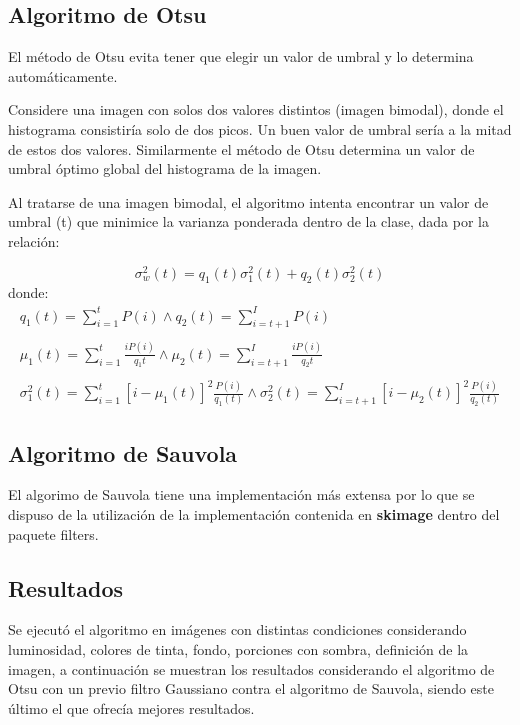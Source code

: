 \subsection{Algoritmo de Otsu}
El método de Otsu evita tener que elegir un valor de umbral y lo determina automáticamente.

Considere una imagen con solos dos valores distintos (imagen bimodal), donde el histograma consistiría solo de dos picos. Un buen valor de umbral sería a la mitad de estos dos valores. Similarmente el método de Otsu determina un valor de umbral óptimo global del histograma de la imagen.

Al tratarse de una imagen bimodal, el algoritmo intenta encontrar un valor de umbral (t) que minimice la varianza ponderada dentro de la clase, dada por la relación:

\begin{equation}
	\sigma _ {w} ^{2}(t) = q_{1}(t) \sigma _{1}^2(t) + q_{2}(t) \sigma _{2}^2(t)
\end{equation}
donde:
\begin{equation}
	\begin{array}{l}
		q_{1}(t) = \sum_{i=1}^{t} P(i) \wedge q_{2}(t) = \sum_{i=t+1}^{I} P(i)\\\\
		\mu_{1}(t) = \sum_{i=1}^{t} \frac{i P(i)}{q_1{t}} \wedge \mu_{2}(t) = \sum_{i=t+1}^{I} \frac{i P(i)}{q_2{t}}\\\\
		\sigma_{1}^2(t) = \sum_{i = 1}^{t} [i - \mu_{1}(t)]^2 \frac{P(i)}{q_{1}(t)} \wedge \sigma_{2}^2(t) = \sum_{i = t+1}^{I} [i - \mu_{2}(t)]^2 \frac{P(i)}{q_{2}(t)}
	\end{array}
\end{equation}



\subsection{Algoritmo de Sauvola}

El algorimo de Sauvola tiene una implementación más extensa por lo que se dispuso de la utilización de la implementación contenida en \textbf{skimage} dentro del paquete filters.




\subsection{Resultados}
Se ejecutó el algoritmo en imágenes con distintas condiciones considerando luminosidad, colores de tinta, fondo, porciones con sombra, definición de la imagen, a continuación se muestran los resultados considerando el algoritmo de Otsu con un previo filtro Gaussiano contra el algoritmo de Sauvola, siendo este último el que ofrecía mejores resultados.


